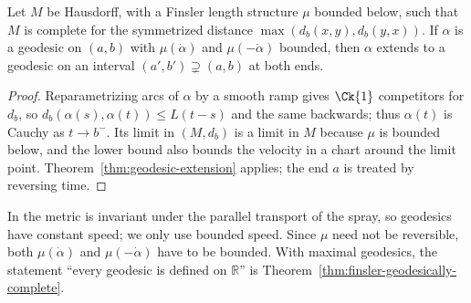 \begin{theorem}
  \label{thm:finsler-geodesic-extension}
  \leanok
  Let $M$ be Hausdorff, with a Finsler length structure $\mu$ bounded below, such that $M$ is
  complete for the symmetrized distance $\max(d_b(x, y), d_b(y, x))$. If $\alpha$ is a geodesic on
  $(a, b)$ with $\mu(\dot\alpha)$ and $\mu(-\dot\alpha)$ bounded, then $\alpha$ extends to a
  geodesic on an interval $(a', b') \supsetneq (a, b)$ at both ends.
\end{theorem}

\begin{proof}
  \leanok
  Reparametrizing arcs of $\alpha$ by a smooth ramp gives $\Ck{1}$ competitors for $d_b$, so
  $d_b(\alpha(s), \alpha(t)) \le L(t - s)$ and the same backwards; thus $\alpha(t)$ is Cauchy as
  $t \to b^-$. Its limit in $(M, d_b)$ is a limit in $M$ because $\mu$ is bounded below, and the
  lower bound also bounds the velocity in a chart around the limit point.
  Theorem~\ref{thm:geodesic-extension} applies; the end $a$ is treated by reversing time.
\end{proof}

\begin{remark}
  In \cite{Lar26} the metric is invariant under the parallel transport of the spray, so geodesics
  have constant speed; we only use bounded speed. Since $\mu$ need not be reversible, both
  $\mu(\dot\alpha)$ and $\mu(-\dot\alpha)$ have to be bounded. With maximal geodesics, the
  statement ``every geodesic is defined on $\mathbb{R}$'' is Theorem~\ref{thm:finsler-geodesically-complete}.
\end{remark}

